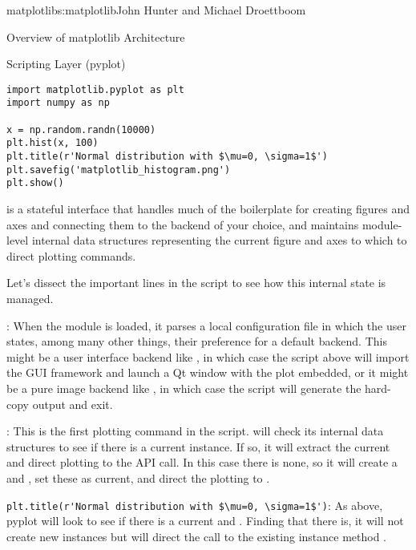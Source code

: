 \begin{aosachapter}{matplotlib}{s:matplotlib}{John Hunter and Michael Droettboom}
\begin{aosasect1}{Overview of matplotlib Architecture}
\begin{aosasect2}{Scripting Layer (pyplot)}
\begin{verbatim}
import matplotlib.pyplot as plt
import numpy as np

x = np.random.randn(10000)
plt.hist(x, 100)
plt.title(r'Normal distribution with $\mu=0, \sigma=1$')
plt.savefig('matplotlib_histogram.png')
plt.show()
\end{verbatim}


 is a stateful interface that handles much of the boilerplate
for creating figures and axes and connecting them to the backend of
your choice, and maintains module-level internal data structures
representing the current figure and axes to which to direct plotting
commands.

Let's dissect the important lines in the script to see how this
internal state is managed.

\begin{aosaitemize}

\item {}: When the  module
  is loaded, it parses a local configuration file in which the user
  states, among many other things, their preference for a default
  backend.  This might be a user interface backend like ,
  in which case the script above will import the GUI framework and
  launch a Qt window with the plot embedded, or it might be a pure
  image backend like , in which case the script will
  generate the hard-copy output and exit.

\item {}: This is the first plotting command in
  the script.   will check its internal data structures to see
  if there is a current  instance.  If so, it will
  extract the current  and direct plotting to the
   API call.  In this case there is none, so it will
  create a  and , set these as current, and
  direct the plotting to .

\item \verb+plt.title(r'Normal distribution with $\mu=0, \sigma=1$')+:
  As above, pyplot will look to see if there is a
  current  and .  Finding that there is, it
  will not create new instances but will direct the call to the
  existing  instance method .


\end{aosaitemize}
\end{aosasect2}
\end{aosasect1}
\end{aosachapter}
